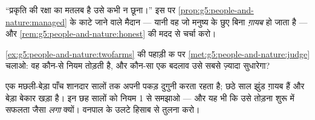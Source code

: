 \begin{exercise}[$\star\star$]\label{exo:g5:people-and-nature:9}
``प्रकृति की रक्षा का मतलब है उसे कभी न छूना।'' इस पर
\cref{prop:g5:people-and-nature:managed} के काटे जाने वाले मैदान ---
यानी वह  जो मनुष्य के छुए बिना \emph{ग़ायब} हो जाता है --- और
\cref{rem:g5:people-and-nature:honest} की मदद से चर्चा करो।
\end{exercise}

\begin{exercise}[$\star\star$]\label{exo:g5:people-and-nature:10}
\cref{ex:g5:people-and-nature:twofarms} की पहाड़ी क पर
\cref{met:g5:people-and-nature:judge} चलाओ: वह कौन-से नियम तोड़ती है,
और कौन-सा एक बदलाव उसे सबसे ज़्यादा सुधारेगा?
\end{exercise}

\begin{exercise}[$\star\star\star$]\label{exo:g5:people-and-nature:11}
एक मछली-बेड़ा पाँच शानदार सालों तक अपनी पकड़ दुगुनी करता रहता है; छठे
साल झुंड ग़ायब हैं और बेड़ा बेकार खड़ा है। इन छह सालों को नियम 1 से
समझाओ --- और यह भी कि उसे तोड़ना शुरू में सफलता जैसा \emph{लगा} क्यों।
वनपाल के उलटे हिसाब से तुलना करो।
\end{exercise}
